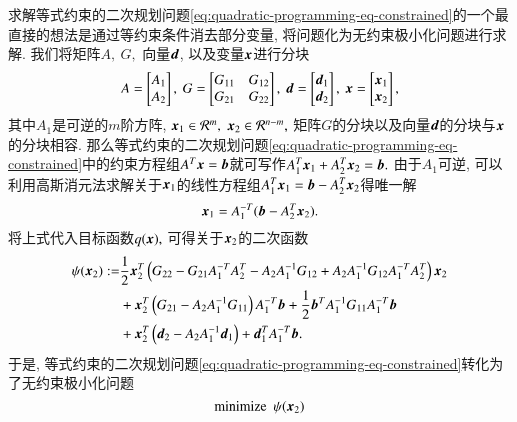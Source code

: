 求解等式约束的二次规划问题\eqref{eq:quadratic-programming-eq-constrained}的一个最直接的想法是通过等约束条件消去部分变量, 将问题化为无约束极小化问题进行求解. 我们将矩阵$A, ~ G,$ 向量${\bm{d}}$, 以及变量${\bm{x}}$进行分块
\begin{equation}
\label{eq:quadratic-programming-eq-blocks}
A = \begin{bmatrix} A_1 \\ A_2 \end{bmatrix}, ~ G = \begin{bmatrix} G_{11} & G_{12} \\ G_{21} & G_{22} \end{bmatrix}, ~ {\bm{d}} = \begin{bmatrix} {\bm{d}}_1 \\ {\bm{d}}_2 \end{bmatrix}, ~ {\bm{x}} = \begin{bmatrix} {\bm{x}}_1 \\ {\bm{x}}_2 \end{bmatrix},
\end{equation}
其中$A_1$是可逆的$m$阶方阵, ${\bm{x}}_1 \in \mathcal{R}^{m},$ ${\bm{x}}_2 \in \mathcal{R}^{n-m},$ 矩阵$G$的分块以及向量${\bm{d}}$的分块与${\bm{x}}$的分块相容. 那么等式约束的二次规划问题\eqref{eq:quadratic-programming-eq-constrained}中的约束方程组$A^T {\bm{x}} = {\bm{b}}$就可写作$A_1^T {\bm{x}}_1 + A_2^T {\bm{x}}_2 = {\bm{b}}.$ 由于$A_1$可逆, 可以利用高斯消元法求解关于${\bm{x}}_1$的线性方程组$A_1^T {\bm{x}}_1 = {\bm{b}} - A_2^T {\bm{x}}_2$得唯一解
\begin{equation}
\label{eq:quadratic-programming-eq-constrained-subs}
{\bm{x}}_1 = A_1^{-T} ({\bm{b}} - A_2^T {\bm{x}}_2).
\end{equation}
将上式代入目标函数$q({\bm{x}}),$ 可得关于${\bm{x}}_2$的二次函数
\begin{equation}
\begin{aligned}
\psi ({\bm{x}}_2) := & \frac{1}{2} {\bm{x}}_2^T \left( G_{22} - G_{21} A_1^{-T} A_2^T - A_2 A_1^{-1} G_{12} + A_2 A_1^{-1} G_{12} A_1^{-T} A_2^T \right) {\bm{x}}_2 \\
& + {\bm{x}}_2^T \left( G_{21} - A_2 A_1^{-1} G_{11} \right) A_1^{-T} {\bm{b}} + \frac{1}{2} {\bm{b}}^T A_1^{-1} G_{11} A_1^{-T} {\bm{b}} \\
& + {\bm{x}}_2^T \left( {\bm{d}}_2 - A_2 A_1^{-1} {\bm{d}}_1 \right) + {\bm{d}}_1^T A_1^{-T} {\bm{b}}.
\end{aligned}
\end{equation}
于是, 等式约束的二次规划问题\eqref{eq:quadratic-programming-eq-constrained}转化为了无约束极小化问题
\begin{equation*}
\text{minimize} ~~ \psi({\bm{x}}_2)
\end{equation*}
